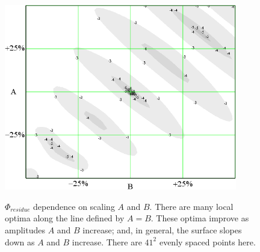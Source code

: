 \begin{figure}
\centering
\includegraphics[width=4.00in]
{amp_amp/amp_amp.png}\\
\caption[$\Phi_{residue}$ dependence on scaling $A$ and $B$]{$\Phi_{residue}$ dependence on scaling $A$ and $B$. There are many local optima along the line defined by $A=B$. These optima improve as amplitudes $A$ and $B$ increase; and, in general, the surface slopes down as $A$ and $B$ increase. There are $41^2$ evenly spaced points here.}
\label{amp amp}
\end{figure} 
